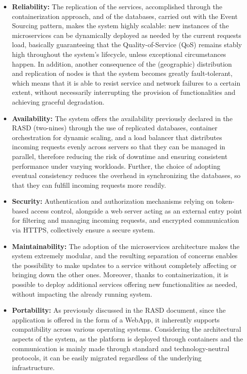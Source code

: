 \begin{itemize}
\item \textbf{Reliability:} The replication of the services, accomplished through the containerization approach, and of the databases, carried out with the Event Sourcing pattern, makes the system highly scalable: new instances of the microservices can be dynamically deployed as needed by the current requests load, basically guaranteeing that the Quality-of-Service (QoS) remains stably high throughout the system's lifecycle, unless exceptional circumstances happen. In addition, another consequence of the (geographic) distribution and replication of nodes is that the system becomes greatly fault-tolerant, which means that it is able to resist service and network failures to a certain extent, without necessarily interrupting the provision of functionalities and achieving graceful degradation.

\item \textbf{Availability:} The system offers the availability previously declared in the RASD (two-nines) through the use of replicated databases, container orchestration for dynamic scaling, and a load balancer that distributes incoming requests evenly across servers so that they can be managed in parallel, therefore reducing the risk of downtime and ensuring consistent performance under varying workloads. Further, the choice of adopting eventual consistency reduces the overhead in synchronizing the databases, so that they can fulfill incoming requests more readily.

\item \textbf{Security:} Authentication and authorization mechanisms relying on token-based access control, alongside a web server acting as an external entry point for filtering and managing incoming requests, and encrypted communication via HTTPS, collectively ensure a secure system.

\item \textbf{Maintainability:} The adoption of the microservices architecture makes the system extremely modular, and the resulting separation of concerns enables the possibility to make updates to a service without completely affecting or bringing down the other ones. Moreover, thanks to containerization, it is possible to deploy additional services offering new functionalities as needed, without impacting the already running system.

\item \textbf{Portability:} As previously discussed in the RASD document, since the application is offered in the form of a WebApp, it inherently supports compatibility across various operating systems. Considering the architectural aspects of the system, as the platform is deployed through containers and the communication is mainly made through standard and technology-neutral protocols, it can be easily migrated regardless of the underlying infrastructure.

\end{itemize} 